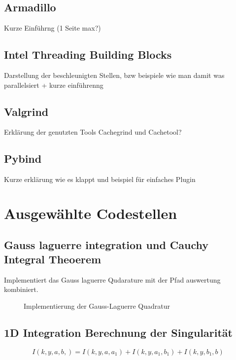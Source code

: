 \subsection{Armadillo}

Kurze Einführng (1 Seite max?)

\subsection{Intel Threading Building Blocks}

Darstellung der beschleunigten Stellen, bzw beispiele wie man damit was parallelsiert + kurze einführenng

\subsection{Valgrind}

Erklärung der genutzten Tools Cachegrind und Cachetool?

\subsection{Pybind}

Kurze erklärung wie es klappt und beispiel für einfaches Plugin


\section{Ausgewählte Codestellen}

\subsection{Gauss laguerre integration und Cauchy Integral Theoerem}

Implementiert das Gauss laguerre Qudarature mit der Pfad auswertung kombiniert.

\begin{figure}
    
    \caption{Implementierung der Gauss-Laguerre Quadratur}
\end{figure}
\subsection{1D Integration Berechnung der Singularität}

\begin{equation}
    I(k,y,a,b,) = I(k,y,a,a_1) + I(k,y,a_1, b_1) + I(k,y,b_1,b)
\end{equation}

